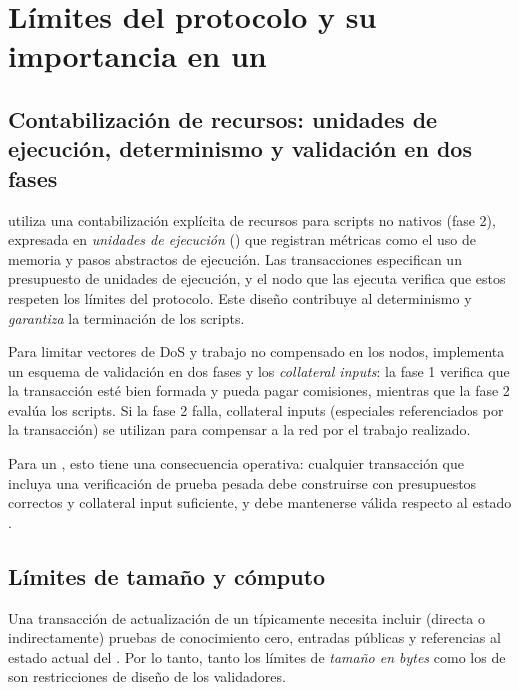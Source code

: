 \section{Límites del protocolo y su importancia en un \zkBridge}
\label{sec:motivation-limites-del-protocolo-y-su-importancia-en-un-zkbridge}

\subsection{Contabilización de recursos: unidades de ejecución, determinismo y validación en dos fases}
\label{subsec:motivation-contabilizacion-de-recursos-unidades-de-ejecucion-determinismo-y-validacion-en-dos-fases}

\Cardano utiliza una contabilización explícita de recursos para scripts no nativos (fase 2), expresada en \emph{unidades de ejecución} (\ExUnits) que registran métricas como el uso de memoria y pasos abstractos de ejecución. Las transacciones especifican un presupuesto de unidades de ejecución, y el nodo que las ejecuta verifica que estos respeten los límites del protocolo. Este diseño contribuye al determinismo y \emph{garantiza} la terminación de los scripts.

Para limitar vectores de DoS y trabajo no compensado en los nodos, \Cardano implementa un esquema de validación en dos fases y los \emph{collateral inputs}: la fase 1 verifica que la transacción esté bien formada y pueda pagar comisiones, mientras que la fase 2 evalúa los scripts. Si la fase 2 falla, collateral inputs (\UTxOs especiales referenciados por la transacción) se utilizan para compensar a la red por el trabajo realizado.

Para un \zkBridge, esto tiene una consecuencia operativa: cualquier transacción que incluya una verificación de prueba pesada debe construirse con presupuestos correctos y collateral input suficiente, y debe mantenerse válida respecto al estado \Onchain.

\subsection{Límites de tamaño y cómputo}
\label{subsec:motivation-limites-de-tamano-y-computo}

Una transacción de actualización de un \zkBridge típicamente necesita incluir (directa o indirectamente) pruebas de conocimiento cero, entradas públicas y referencias al estado actual del \Bridge. Por lo tanto, tanto los límites de \emph{tamaño en bytes} como los de \ExUnits son restricciones de diseño de los validadores.

